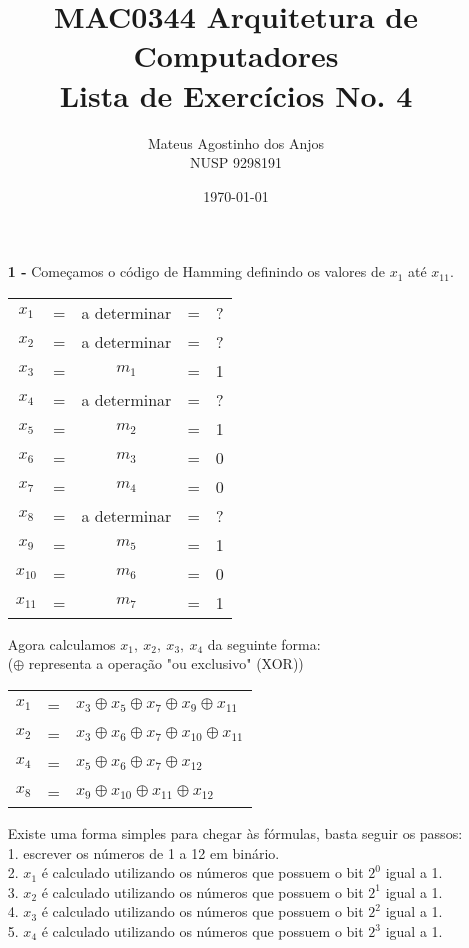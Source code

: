 \documentclass[12pt]{article}
\title{MAC0344 Arquitetura de Computadores\\
Lista de Exercícios No. 4
}
\author{Mateus Agostinho dos Anjos\\NUSP 9298191}
\date{\today}
\begin{document}
	\maketitle
	\begin{itemize}
		\item[\textbf{1 -}]
			\hfill\newline
			Começamos o código de Hamming definindo os valores de $x_1$ até $x_{11}$.
			\begin{center}
				\begin{tabular}{ccccc}
					$x_1$ & = & a determinar & = & ?\\
					$x_2$ & = & a determinar& = & ?\\
					$x_3$ & = & $m_1$ & = & 1 \\
					$x_4$ & = & a determinar & = & ?\\
					$x_5$ & = & $m_2$ & = & 1\\
					$x_6$ & = & $m_3$ & = & 0\\
					$x_7$ & = & $m_4$ & = & 0\\
					$x_8$ & = & a determinar & = & ?\\
					$x_9$ & = & $m_5$ & = & 1\\
					$x_{10}$ & = & $m_6$ & = & 0\\
					$x_{11}$ & = & $m_7$ & =& 1\\
				\end{tabular}
			\end{center}
			Agora calculamos $x_1, \ x_2, \ x_3, \ x_4$ da seguinte forma:\\
			($\oplus$ representa a operação "ou exclusivo" (XOR))
			\begin{center}
				\begin{tabular}{ccl}
					$x_1$ & = & $x_3 \oplus x_5 \oplus x_7 \oplus x_9 \oplus x_{11}$\\
					$x_2$ & = & $x_3 \oplus x_6 \oplus x_7 \oplus x_{10} \oplus x_{11}$\\
					$x_4$ & = & $x_5 \oplus x_6 \oplus x_7 \oplus x_{12}$\\
					$x_8$ & = & $x_9 \oplus x_{10} \oplus x_{11} \oplus x_{12}$\\
				\end{tabular}
			\end{center}
			\newpage
			Existe uma forma simples para chegar às fórmulas, basta seguir os passos:\\
			1. escrever os números de 1 a 12 em binário.\\
			2. $x_1$ é calculado utilizando os números que possuem o bit $2^0$ igual a 1.\\
			3. $x_2$ é calculado utilizando os números que possuem o bit $2^1$ igual a 1.\\
			4. $x_3$ é calculado utilizando os números que possuem o bit $2^2$ igual a 1.\\
			5. $x_4$ é calculado utilizando os números que possuem o bit $2^3$ igual a 1.\\
	
	\end{itemize}
\end{document}

